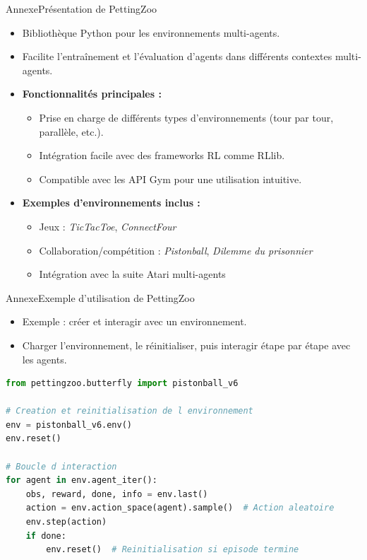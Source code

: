\begin{frame}{Annexe}{Présentation de PettingZoo}

    \begin{itemize}
        \item Bibliothèque Python pour les environnements multi-agents.
        \item Facilite l'entraînement et l'évaluation d'agents dans différents contextes multi-agents.

        \item \textbf{Fonctionnalités principales :}
              \begin{itemize}
                  \item Prise en charge de différents types d’environnements (tour par tour, parallèle, etc.).
                  \item Intégration facile avec des frameworks RL comme RLlib.
                  \item Compatible avec les API Gym pour une utilisation intuitive.
              \end{itemize}

        \item \textbf{Exemples d’environnements inclus :}
              \begin{itemize}
                  \item Jeux : \textit{TicTacToe}, \textit{ConnectFour}
                  \item Collaboration/compétition : \textit{Pistonball}, \textit{Dilemme du prisonnier}
                  \item Intégration avec la suite Atari multi-agents
              \end{itemize}
    \end{itemize}

\end{frame}

\begin{frame}[fragile]{Annexe}{Exemple d'utilisation de PettingZoo}
    \begin{itemize}
        \item Exemple : créer et interagir avec un environnement.
        \item Charger l’environnement, le réinitialiser, puis interagir étape par étape avec les agents.
    \end{itemize}
    \vspace{0.3cm}
    \begin{lstlisting}[language=Python, basicstyle=\ttfamily\small]
from pettingzoo.butterfly import pistonball_v6

# Creation et reinitialisation de l environnement
env = pistonball_v6.env()
env.reset()

# Boucle d interaction
for agent in env.agent_iter():
    obs, reward, done, info = env.last()
    action = env.action_space(agent).sample()  # Action aleatoire
    env.step(action)
    if done:
        env.reset()  # Reinitialisation si episode termine
    \end{lstlisting}
\end{frame}

